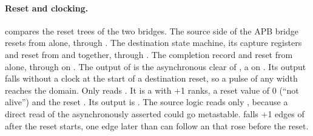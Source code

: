 \paragraph{Reset and clocking.}  compares the reset trees of the two bridges. The source side of the APB bridge resets from  alone, through . The destination state machine, its capture registers and  reset from  and  together, through . The completion record and  reset from  alone, through  on . The output  of  is the asynchronous clear of , a  on . Its output  falls without a clock at the start of a destination reset, so a pulse of any width reaches the  domain. Only  reads . It is a  with +1 ranks, a reset value of 0 (``not alive'') and the reset . Its output is . The source logic reads only , because a direct read of the asynchronously asserted  could go metastable.  falls +1 edges of  after the reset starts, one edge later than  can follow an  that rose before the reset.

